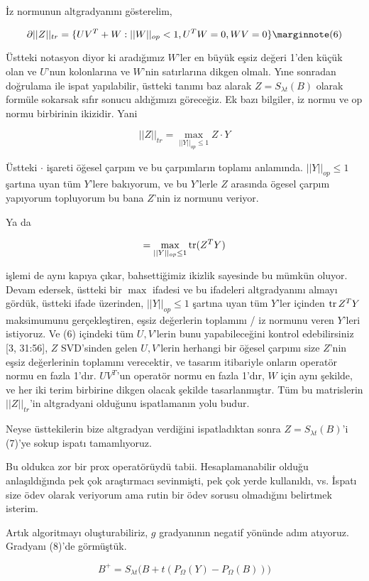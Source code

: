 \documentclass[12pt,fleqn]{article}\usepackage{../../common}
\begin{document}
İz normunun altgradyanını gösterelim, 

$$
\partial ||Z||_{tr} = \{  UV^T + W : ||W||_{op} < 1, U^TW = 0, WV = 0 \}
\mlabel{6}
$$

Üstteki notasyon diyor ki aradığımız $W$'ler en büyük eşsiz değeri 1'den
küçük olan ve $U$'nun kolonlarına ve $W$'nin satırlarına dikgen
olmalı. Yıne sonradan doğrulama ile ispat yapılabilir, üstteki tanımı baz
alarak $Z = S_{\lambda t}(B)$ olarak formüle sokarsak sıfır sonucu
aldığımızı göreceğiz. Ek bazı bilgiler, iz normu ve op normu birbirinin
ikizidir. Yani

$$
||Z||_{tr} = \max_{||Y||_{op} \le 1}  Z \cdot Y
$$

Üstteki $\cdot$ işareti öğesel çarpım ve bu çarpımların toplamı
anlamında. $||Y||_{op} \le 1$ şartına uyan tüm $Y$'lere bakıyorum, ve bu
$Y$'lerle $Z$ arasında ögesel çarpım yapıyorum topluyorum bu bana $Z$'nin
iz normunu veriyor. 
 
Ya da

$$
= \max_{||Y||_{op} \le 1}  \operatorname{tr} (Z^TY)
$$

işlemi de aynı kapıya çıkar, bahsettiğimiz ikizlik sayesinde bu mümkün
oluyor. Devam edersek, üstteki bir $\max$ ifadesi ve bu ifadeleri
altgradyanını almayı gördük, üstteki ifade üzerinden, $||Y||_{op} \le 1$
şartına uyan tüm $Y$'ler içinden $\operatorname{tr}{Z^TY}$ maksimumunu gerçekleştiren,
eşsiz değerlerin toplamını / iz normunu veren $Y$'leri istiyoruz. Ve (6)
içindeki tüm $U,V$'lerin bunu yapabileceğini kontrol edebilirsiniz [3,
31:56], $Z$ SVD'sinden gelen $U,V$'lerin herhangi bir öğesel çarpımı size
$Z$'nin eşsiz değerlerinin toplamını verecektir, ve tasarım itibariyle
onların operatör normu en fazla 1'dır. $ UV^T$'un operatör normu en fazla
1'dır, $W$ için aynı şekilde, ve her iki terim birbirine dikgen olacak
şekilde tasarlanmıştır. Tüm bu matrislerin $||Z||_{tr} $'in altgradyani
olduğunu ispatlamanın yolu budur. 

Neyse üsttekilerin bize altgradyan verdiğini ispatladıktan sonra
$Z = S_{\lambda t}(B)$'i (7)'ye sokup ispatı tamamlıyoruz.  

Bu oldukca zor bir prox operatörüydü tabii. Hesaplamanabilir olduğu
anlaşıldığında pek çok araştırmacı sevinmişti, pek çok yerde kullanıldı,
vs. İspatı size ödev olarak veriyorum ama rutin bir ödev sorusu olmadığını
belirtmek isterim. 

Artık algoritmayı oluşturabiliriz, $g$ gradyanının negatif yönünde adım
atıyoruz. Gradyanı (8)'de görmüştük. 

$$
B^+ = S_{\lambda t} \bigg( 
B + t (P_\Omega(Y) - P_\Omega(B) )
\bigg)
$$
\end{document}
